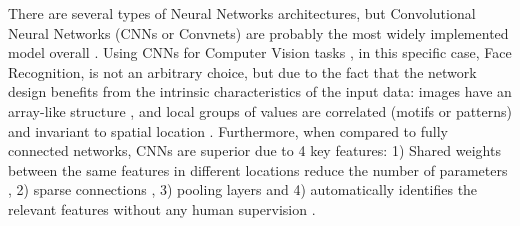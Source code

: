 \documentclass[class=report, crop=false, a4paper, 12pt]{standalone}
\begin{document}
\par There are several types of Neural Networks architectures, but Convolutional Neural Networks (CNNs or Convnets) are probably the most widely implemented model overall \autocite{yamashitaConvolutionalNeuralNetworks2018, liSurveyConvolutionalNeural2022}. Using CNNs for Computer Vision tasks \autocite{krizhevskyImageNetClassificationDeep2012,taigmanDeepFaceClosingGap2014,tompsonEfficientObjectLocalization2015, zhangImprovedBreastCancer2021}, in this specific case, Face Recognition, is not an arbitrary choice, but due to the fact that the network design benefits from the intrinsic characteristics of the input data: images have an array-like structure \autocite{yamashitaConvolutionalNeuralNetworks2018}, and local groups of values are correlated (motifs or patterns) and invariant to spatial location \autocite{lecunDeepLearning2015,caoReviewNeuralNetworks2018}. Furthermore, when compared to fully connected networks, CNNs are superior due to 4 key features: 1) Shared weights between the same features in different locations reduce the number of parameters \autocite{liSurveyConvolutionalNeural2022}, 2) sparse connections \autocite{alzubaidiReviewDeepLearning2021}, 3) pooling layers and 4) automatically identifies the relevant features without any human supervision \autocite{alzubaidiReviewDeepLearning2021,liSurveyConvolutionalNeural2022}.
\end{document}
